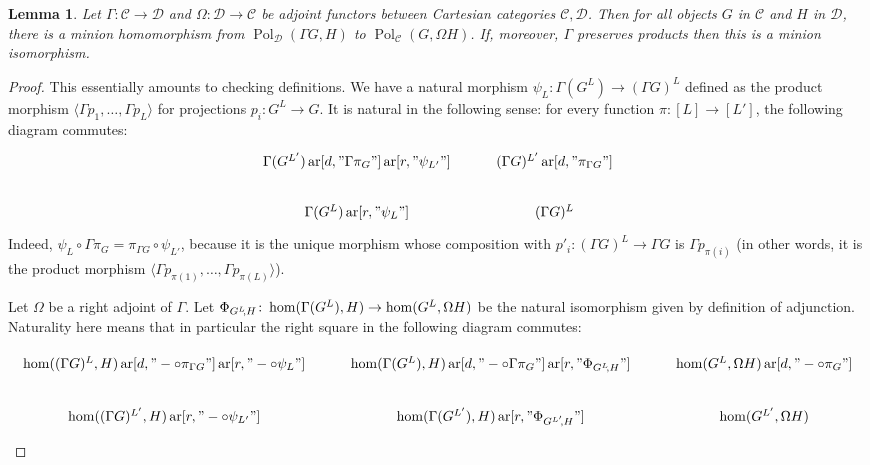 \documentclass[11pt,a4paper]{scrartcl}
\numberwithin{theorem}{section}
\newtheorem{lemma}[theorem]{Lemma}
\theoremstyle{definition}
\newcommand{\Cc}{\mathcal{C}}
\newcommand{\Dd}{\mathcal{D}}
\DeclareMathOperator{\Pol}{Pol}
\DeclareMathOperator{\ar}{ar}
\begin{document}
\begin{lemma}\label{lem:cat}
	Let $\Gamma\colon \Cc\to\Dd$ and $\Omega\colon \Dd\to\Cc$ be adjoint functors between Cartesian categories $\Cc,\Dd$.
	Then for all objects $G$ in $\Cc$ and $H$ in $\Dd$,
	there is a minion homomorphism from $\Pol_{\Dd}(\Gamma G, H)$ to $\Pol_{\Cc}(G,\Omega H)$.
	If, moreover, $\Gamma$ preserves products then this is a minion isomorphism.
\end{lemma}
\begin{proof}
	This essentially amounts to checking definitions.
	We have a natural morphism $\psi_L \colon \Gamma(G^L) \to (\Gamma G)^L$
	defined as the product morphism $\langle \Gamma p_1,\dots, \Gamma p_L \rangle$ for projections $p_i \colon G^L \to G$.
	It is natural in the following sense: for every function $\pi\colon [L] \to [L']$, the following diagram commutes:\vspace*{-\baselineskip}
	$$\begin{tikzcd}
		\Gamma(G^{L'}) \ar[d, "\Gamma \pi_G"] \ar[r, "\psi_{L'}"] &
		(\Gamma G)^{L'} \ar[d, "\pi_{\Gamma G}"] \\
		\Gamma(G^L) \ar[r, "\psi_L"] & (\Gamma G)^L
	\end{tikzcd}$$
	\noindent
	Indeed, $\psi_L \circ  \Gamma \pi_G = \pi_{\Gamma G} \circ \psi_{L'}$, because it is the unique morphism whose composition with $p'_i \colon (\Gamma G)^L \to \Gamma G$ is $\Gamma p_{\pi(i)}$ (in other words, it is the product morphism $\langle \Gamma p_{\pi(1)},\dots, \Gamma p_{\pi(L)} \rangle$).

	Let $\Omega$ be a right adjoint of $\Gamma$.
	Let $\Phi_{G^L\kern-.2em,H} \colon  \hom(\Gamma(G^L),H) \to \hom(G^L,\Omega H)$ be the natural isomorphism given by definition of adjunction. Naturality here means that in particular the right square in the following diagram commutes:

	\[\begin{tikzcd}
		\hom((\Gamma G)^L,    H) \ar[d, "-\circ\pi_{\Gamma G}"] \ar[r, "-\circ\psi_L"]               &
		\hom(\Gamma(G^L),    H)  \ar[d, "-\circ\Gamma\pi_G"]    \ar[r, "\Phi_{G^L\kern-.2em,H}"]     &			
		\hom(G^L,   \Omega H)    \ar[d, "-\circ\pi_G"]                                               \\
		\hom((\Gamma G)^{L'}, H)                                \ar[r, "-\circ\psi_{L'}"]            &
		\hom(\Gamma(G^{L'}), H)                                 \ar[r, "\Phi_{G^{L'}\kern-.2em,H}"]  &
		\hom(G^{L'},\Omega H)                                   
	\end{tikzcd}\]


\end{proof}
\end{document}
